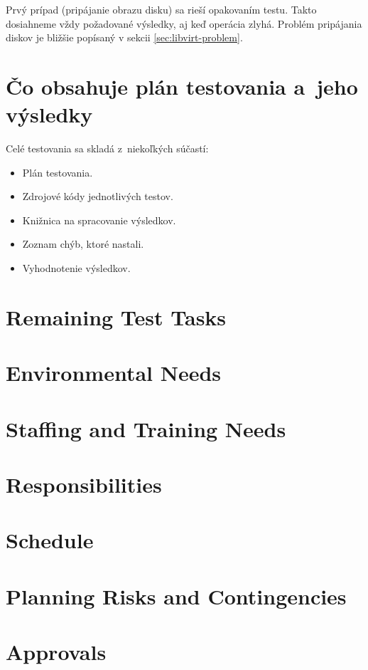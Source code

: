 Prvý prípad (pripájanie obrazu disku) sa rieší opakovaním testu. Takto
dosiahneme vždy požadované výsledky, aj keď operácia zlyhá. Problém pripájania
diskov je bližšie popísaný v sekcii \ref{sec:libvirt-problem}.

\section{Čo obsahuje plán testovania a~jeho výsledky}

Celé testovania sa skladá z~niekoľkých súčastí:

\begin{itemize}
    \item Plán testovania.
    \item Zdrojové kódy jednotlivých testov.
    \item Knižnica na spracovanie výsledkov.
    \item Zoznam chýb, ktoré nastali.
    \item Vyhodnotenie výsledkov.
\end{itemize}

\section{Remaining Test Tasks}
\section{Environmental Needs}
\section{Staffing and Training Needs}
\section{Responsibilities}
\section{Schedule}
\section{Planning Risks and Contingencies}
\section{Approvals}
